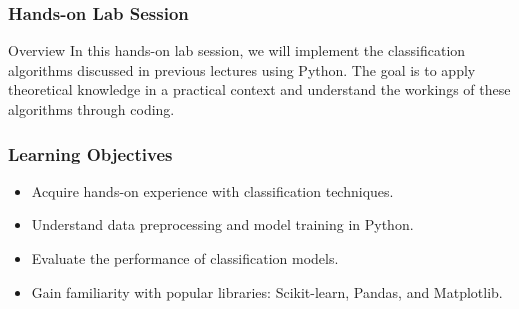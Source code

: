 \documentclass[aspectratio=169]{beamer}
\begin{document}
\begin{frame}[fragile]
    \frametitle{Hands-on Lab Session}
    \begin{block}{Overview}
        In this hands-on lab session, we will implement the classification algorithms discussed in previous lectures using Python. 
        The goal is to apply theoretical knowledge in a practical context and understand the workings of these algorithms through coding.
    \end{block}
\end{frame}

\begin{frame}
    \frametitle{Learning Objectives}
    \begin{itemize}
        \item Acquire hands-on experience with classification techniques.
        \item Understand data preprocessing and model training in Python.
        \item Evaluate the performance of classification models.
        \item Gain familiarity with popular libraries: Scikit-learn, Pandas, and Matplotlib.
    \end{itemize}
\end{frame}
\end{document}
